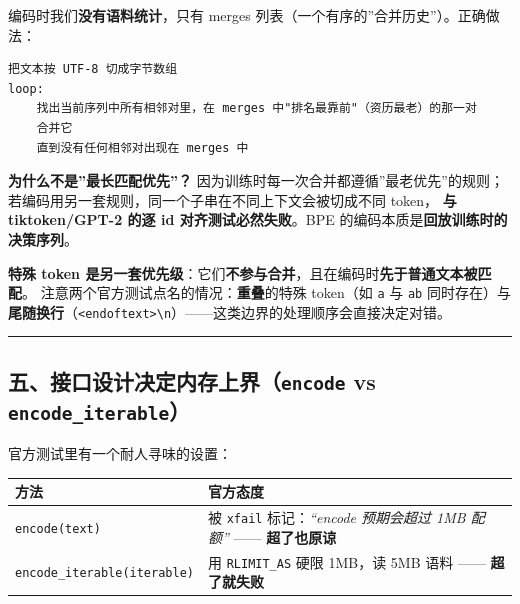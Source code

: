 \documentclass[
  chinese,
  11pt,
]{ctexart}
\newcounter{none} %
\begin{document}
编码时我们\textbf{没有语料统计}，只有 merges 列表（一个有序的''合并历史''）。正确做法：

\begin{verbatim}
把文本按 UTF-8 切成字节数组
loop:
    找出当前序列中所有相邻对里，在 merges 中"排名最靠前"（资历最老）的那一对
    合并它
    直到没有任何相邻对出现在 merges 中
\end{verbatim}

\textbf{为什么不是''最长匹配优先''？} 因为训练时每一次合并都遵循''最老优先''的规则； 若编码用另一套规则，同一个子串在不同上下文会被切成不同 token， \textbf{与 tiktoken/GPT-2 的逐 id 对齐测试必然失败}。BPE 的编码本质是\textbf{回放训练时的决策序列}。

\textbf{特殊 token 是另一套优先级}：它们\textbf{不参与合并}，且在编码时\textbf{先于普通文本被匹配}。 注意两个官方测试点名的情况：\textbf{重叠}的特殊 token（如 \texttt{a} 与 \texttt{ab} 同时存在）与 \textbf{尾随换行}（\texttt{\textless{}\textbar{}endoftext\textbar{}\textgreater{}\textbackslash{}n}）------这类边界的处理顺序会直接决定对错。

\begin{center}\rule{0.5\linewidth}{0.5pt}\end{center}

\subsection{\texorpdfstring{五、接口设计决定内存上界（\texttt{encode} vs \texttt{encode\_iterable}）}{五、接口设计决定内存上界（encode vs encode\_iterable）}}\label{ux4e94ux63a5ux53e3ux8bbeux8ba1ux51b3ux5b9aux5185ux5b58ux4e0aux754cencode-vs-encode_iterable}

官方测试里有一个耐人寻味的设置：

{\def\LTcaptype{none} %
\begin{longtable}[]{@{}
  >{\raggedright\arraybackslash}p{}
  >{\raggedright\arraybackslash}p{}@{}}
\toprule\noalign{}
\begin{minipage}[b]{\linewidth}\raggedright
方法
\end{minipage} & \begin{minipage}[b]{\linewidth}\raggedright
官方态度
\end{minipage} \\
\midrule\noalign{}
\endhead
\bottomrule\noalign{}
\endlastfoot
\texttt{encode(text)} & 被 \texttt{xfail} 标记：\emph{``encode 预期会超过 1MB 配额''} ------ \textbf{超了也原谅} \\
\texttt{encode\_iterable(iterable)} & 用 \texttt{RLIMIT\_AS} 硬限 1MB，读 5MB 语料 ------ \textbf{超了就失败} \\
\end{longtable}
}
\end{document}
